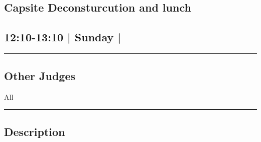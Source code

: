 \documentclass[10pt, A5]{article}
\begin{document}
	

		\begin{framed}
			\begin{minipage}{\textwidth}

			\setcounter{section}{113}
							\section{Capsite Deconsturcution and lunch}
						
			\subsection*{12:10-13:10 | Sunday | }

			\vspace{0.25cm}
			\hrule
			\vspace{0.25cm}


			\subsection*{Other Judges}
							All

					\vspace{0.25cm}
			\hrule
			\vspace{0.25cm}

			\begin{minipage}{\textwidth}
			\subsection*{\faListAlt \: Description}
			
			\end{minipage}


	\end{minipage}
	\end{framed}

	
\end{document}
